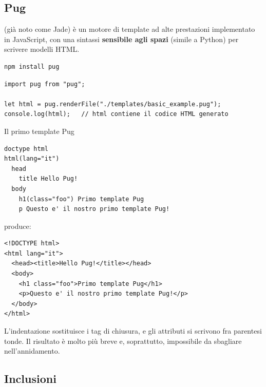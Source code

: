 
\subsection{Pug}

 (già noto come Jade) è un motore di template ad alte prestazioni
implementato in JavaScript, con una sintassi \textbf{sensibile agli spazi}
(simile a Python) per scrivere modelli HTML.

\begin{lstlisting}[style=shell]
npm install pug
\end{lstlisting}

\begin{lstlisting}[style=js]
import pug from "pug";

let html = pug.renderFile("./templates/basic_example.pug");
console.log(html);   // html contiene il codice HTML generato
\end{lstlisting}

\begin{esempio}{Il primo template Pug}
\begin{lstlisting}[style=pug, name=basic_example.pug]
doctype html
html(lang="it")
  head
    title Hello Pug!
  body
    h1(class="foo") Primo template Pug
    p Questo e' il nostro primo template Pug!
\end{lstlisting}

produce:

\begin{lstlisting}[style=html, name=output.html]
<!DOCTYPE html>
<html lang="it">
  <head><title>Hello Pug!</title></head>
  <body>
    <h1 class="foo">Primo template Pug</h1>
    <p>Questo e' il nostro primo template Pug!</p>
  </body>
</html>
\end{lstlisting}

L'indentazione sostituisce i tag di chiusura, e gli attributi si scrivono fra
parentesi tonde. Il risultato è molto più breve e, soprattutto, impossibile da
sbagliare nell'annidamento.
\end{esempio}

\subsection{Inclusioni}

